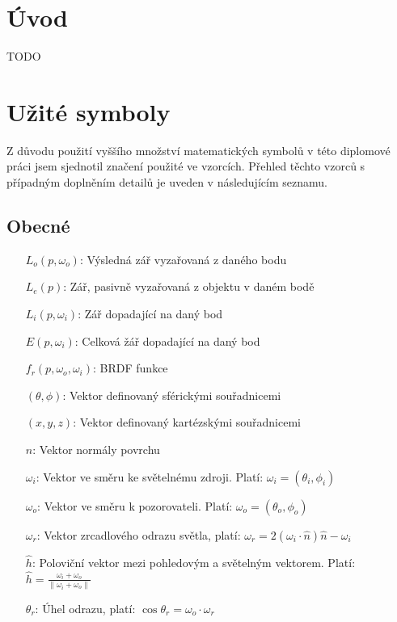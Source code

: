 \documentclass[czech,master]{diploma}
\newcommand{\uvec}[1]{\hat{#1}}
\newcommand{\point}{p}
\newcommand{\brdf}{f_r\left(\point,\omega_{o},\omega_{i}\right)}
\newcommand{\normVec}{\uvec{n}}
\newcommand{\inVec}{\omega_{i}}
\newcommand{\outVec}{\omega_{o}}
\newcommand{\refl}{\omega_{r}}
\newcommand{\halfVec}{\uvec{h}}
\newcommand{\outRadiance}{L_o\left(\point,\outVec\right)}
\newcommand{\inRadiance}{L_i\left(\point,\inVec\right)}
\newcommand{\emitRadiance}{L_e\left(\point\right)}
\newcommand{\irradiance}{E\left(\point,\inVec\right)}
\begin{document}
\MakeTitlePages

\chapter{Úvod}
TODO


\clearpage
\chapter{Užité symboly}
Z důvodu použití vyššího množství matematických symbolů v této diplomové práci jsem sjednotil značení použité ve vzorcích. Přehled těchto vzorců s případným doplněním detailů je uveden v následujícím seznamu.
\section{Obecné}
\begin{itemize}
  \item[\(\outRadiance\):] Výsledná zář vyzařovaná z daného bodu
  \item[\(\emitRadiance\):] Zář, pasivně vyzařovaná z objektu v daném bodě
  \item[\(\inRadiance\):] Zář dopadající na daný bod
  \item[\(\irradiance\):] Celková žář dopadající na daný bod
  \item[\(\brdf\):] BRDF funkce
  \item[\(\left(\theta,\phi\right)\):] Vektor definovaný sférickými souřadnicemi
  \item[\(\left(x,y,z\right)\):] Vektor definovaný kartézskými souřadnicemi
  \item[\(\normVec\):] Vektor normály povrchu
  \item[\(\inVec\):] Vektor ve směru ke světelnému zdroji. Platí: \(\inVec = \left(\theta_i,\phi_i\right)\)
  \item[\(\outVec\):] Vektor ve směru k pozorovateli. Platí: \(\outVec = \left(\theta_o,\phi_o\right)\)
  \item[\(\refl\):] Vektor zrcadlového odrazu světla, platí: \(\refl = 2\left(\inVec\cdot\normVec\right)\normVec-\inVec\)
  \item[\(\halfVec\):] Poloviční vektor mezi pohledovým a světelným vektorem. Platí: \(\halfVec = \frac{\inVec + \outVec}{\| \inVec + \outVec\|}\)
  \item[\(\theta_r\):] Úhel odrazu, platí: \(\cos\theta_r = \outVec\cdot\refl\)
\end{itemize}
\end{document}
